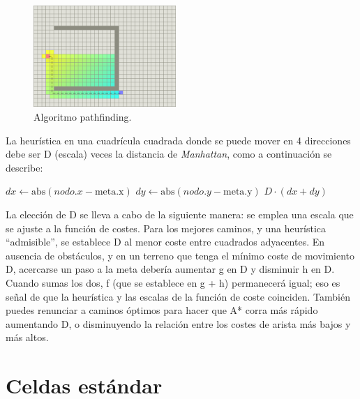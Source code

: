 \documentclass[reprint,amsmath,amssymb,aps]{revtex4-2}
\begin{document}
\begin{figure}[H]
	\centering
	\includegraphics[width=0.48\textwidth]{a-star-trap.png}
	\caption{Algoritmo pathfinding.}
	\label{a-star-trap}
\end{figure}

La heurística en una cuadrícula cuadrada donde se puede mover en 4 direcciones debe ser D (escala) veces la distancia de \textit{Manhattan}, como a continuación se describe:

\begin{algorithmic}
        \State $dx \gets \text{abs}(nodo.x - \text{meta.x})$
        \State $dy \gets \text{abs}(nodo.y - \text{meta.y})$
        \State \Return $D \cdot (dx + dy)$
    \EndFunction
\end{algorithmic}


La elección de D se lleva a cabo de la siguiente manera: se emplea una escala que se ajuste a la función de costes. Para los mejores caminos, y una heurística ``admisible'', se establece D al menor coste entre cuadrados adyacentes. En ausencia de obstáculos, y en un terreno que tenga el mínimo coste de movimiento D, acercarse un paso a la meta debería aumentar g en D y disminuir h en D. Cuando sumas los dos, f (que se establece en g + h) permanecerá igual; eso es señal de que la heurística y las escalas de la función de coste coinciden. También puedes renunciar a caminos óptimos para hacer que A* corra más rápido aumentando D, o disminuyendo la relación entre los costes de arista más bajos y más altos.

\section{Celdas estándar}
\end{document}
